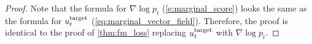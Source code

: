 \begin{proof}
Note that the formula for $\nabla\log p_t$ (\cref{e:marginal_score}) looks the same as the formula for $u^{\text{target}}_t$ (\cref{eq:marginal_vector_field}). Therefore, the proof is identical to the proof of \cref{thm:fm_loss} replacing $u^{\text{target}}_t$ with $\nabla\log p_t$.
\end{proof}



